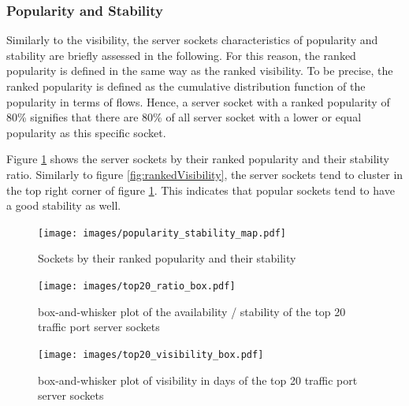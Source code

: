 \subsubsection{Popularity and Stability}
Similarly to the visibility, the \glspl{server socket} characteristics of 
popularity and stability are briefly assessed in the following. For this reason, 
the ranked popularity is defined in the same way as the ranked visibility. 
To be precise, the ranked popularity is defined as the cumulative distribution 
function of the popularity in terms of flows. Hence, a \gls{server socket} with 
a ranked popularity of 80\% signifies that there are 80\% of all \gls{server 
socket} with a lower or equal popularity as this specific socket.

Figure \ref{fig:rankedPopularity} shows the \glspl{server socket} by their 
ranked popularity and their stability ratio. Similarly to figure 
\ref{fig:rankedVisibility}, the \glspl{server socket} tend to cluster in the top 
right corner of figure \ref{fig:rankedPopularity}. This indicates that popular 
sockets tend to have a good stability as well. 


\begin{figure}
	[ht] \centering 
	\texttt{[image: images/popularity\_stability\_map.pdf]}
	\caption{Sockets by their ranked popularity and their stability} 
	\label{fig:rankedPopularity} 
\end{figure}

\begin{landscape}
	\begin{figure}
	[p] \centering 
	\texttt{[image: images/top20\_ratio\_box.pdf]}
	\caption{box-and-whisker plot of the availability / stability of the top 20 traffic port server sockets} 
	\label{fig:top20_ratio_box} 
\end{figure}
\end{landscape}

\begin{landscape}
\begin{figure}
	[p] \centering 
	\texttt{[image: images/top20\_visibility\_box.pdf]}
	\caption{box-and-whisker plot of visibility in days of the top 20 traffic port server sockets}
	\label{fig:top20_visibledays_box}
\end{figure}
\end{landscape}

